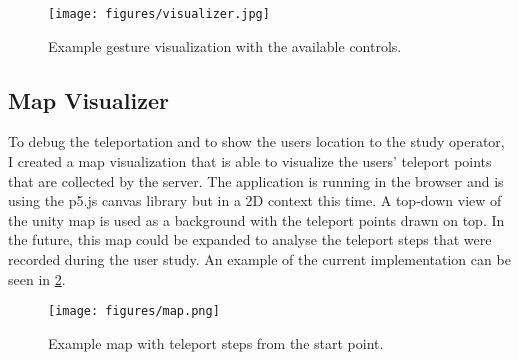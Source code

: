 \begin{figure}[!ht]
    \centering
    \texttt{[image: figures/visualizer.jpg]}
    \caption{Example gesture visualization with the available controls.}
    \label{fig:vis}
\end{figure}


\subsection{Map Visualizer}
To debug the teleportation and to show the users location to the study operator, I created a map visualization that is able to visualize the users' teleport points that are collected by the server. The application is running in the browser and is using the p5.js canvas library but in a 2D context this time. A top-down view of the unity map is used as a background with the teleport points drawn on top. In the future, this map could be expanded to analyse the teleport steps that were recorded during the user study. An example of the current implementation can be seen in \ref{fig:map}.

\begin{figure}[!ht]
    \centering
    \texttt{[image: figures/map.png]}
    \caption{Example map with teleport steps from the start point.}
    \label{fig:map}
\end{figure}
